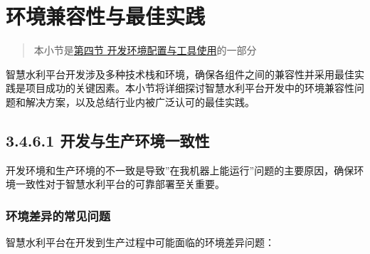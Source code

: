 \section{环境兼容性与最佳实践}\label{ux73afux5883ux517cux5bb9ux6027ux4e0eux6700ux4f73ux5b9eux8df5}

\begin{quote}
本小节是\href{section03-04.md}{第四节 开发环境配置与工具使用}的一部分
\end{quote}

智慧水利平台开发涉及多种技术栈和环境，确保各组件之间的兼容性并采用最佳实践是项目成功的关键因素。本小节将详细探讨智慧水利平台开发中的环境兼容性问题和解决方案，以及总结行业内被广泛认可的最佳实践。

\subsection{3.4.6.1
开发与生产环境一致性}\label{ux5f00ux53d1ux4e0eux751fux4ea7ux73afux5883ux4e00ux81f4ux6027}

开发环境和生产环境的不一致是导致''在我机器上能运行''问题的主要原因，确保环境一致性对于智慧水利平台的可靠部署至关重要。

\subsubsection{环境差异的常见问题}\label{ux73afux5883ux5deeux5f02ux7684ux5e38ux89c1ux95eeux9898}

智慧水利平台在开发到生产过程中可能面临的环境差异问题：

